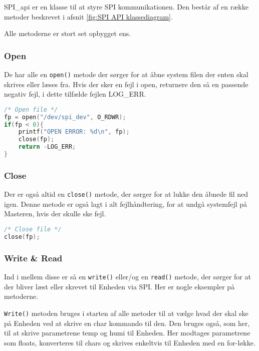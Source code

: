 
SPI\_api er en klasse til at styre SPI kommunikationen. Den består af en række metoder beskrevet i afsnit \ref{fig:SPI API klassediagram}.

Alle metoderne er stort set opbygget ens.

\subsubsection*{Open}

De har alle en \verb+open()+ metode der sørger for at åbne system filen der enten skal skrives eller læses fra. Hvis der sker en fejl i open, returnere den så en passende negativ fejl, i dette tilfælde fejlen LOG\_ERR.

\begin{lstlisting}[language=C]
/* Open file */
fp = open("/dev/spi_dev", O_RDWR);
if(fp < 0){
	printf("OPEN ERROR: %d\n", fp);
	close(fp);
	return -LOG_ERR;
}
\end{lstlisting}

\subsubsection*{Close}

Der er også altid en \verb+close()+ metode, der sørger for at lukke den åbnede fil ned igen. Denne metode er også lagt i alt fejlhåndtering, for at undgå systemfejl på Masteren, hvis der skulle ske fejl.



\begin{lstlisting}[language=C]
/* Close file */
close(fp);
\end{lstlisting}

\subsubsection*{Write \& Read}

Ind i mellem disse er så en \verb+write()+ eller/og en \verb+read()+ metode, der sørger for at der bliver læst eller skrevet til Enheden via SPI. Her er nogle eksempler på metoderne.

\verb+Write()+ metoden bruges i starten af alle metoder til at vælge hvad der skal ske på Enheden ved at skrive en char kommando til den. Den bruges også, som her, til at skrive parametrene temp og humi til Enheden. Her modtages parametrene som floats, konverteres til chars og skrives enkeltvis til Enheden med en for-løkke.

